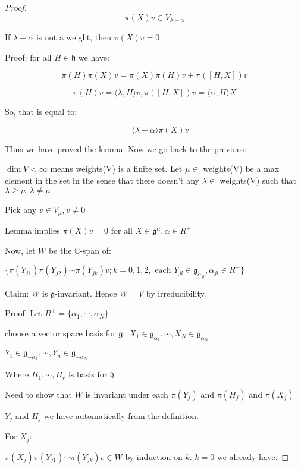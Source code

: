 \documentclass{article}
\theoremstyle{definition}
\begin{document}
\begin{proof}
    \[
        \pi (X)v \in V_{\lambda + \alpha}
    \]

    If \(\lambda + \alpha\) is not a weight, then \(\pi (X)v = 0\) 
    
    Proof: for all \(H\in \mathfrak{h}\) we have:

    \[
        \pi(H)\pi(X)v = \pi(X)\pi(H)v + \pi([H,X]) v
    \]

    \[
        \pi(H)v = \langle \lambda , H \rangle v, \pi ([H,X])v = \langle \alpha,H \rangle X
    \]

    So, that is equal to:

    \[
        = \langle \lambda + \alpha \rangle \pi(X)v
    \]

    Thus we have proved the lemma. Now we go back to the previous:
    
    \(\dim V < \infty\) means weights(V) is a finite set. Let \(\mu \in \) weights(V) be a max element in the set in the sense that there doesn't any \(\lambda \in\) weights(V) such that \(\lambda \geq \mu, \lambda \neq \mu\) 

    Pick any \(v\in V_\mu, v\neq 0\)
    
    Lemma implies \(\pi(X)v = 0\) for all \(X\in \mathfrak{g} ^\alpha , \alpha \in R^+\) 

    Now, let \(W\) be the \(\mathbb{C}\)-span of:

    \(\{ \pi(Y_{j1}) \pi(Y_{j2})\cdots \pi(Y_{jk}) v ; k = 0,1,2, \text{ each } Y_{jl} \in \mathfrak{g}_{\alpha_{jl}}, \alpha_{jl}\in R^- \} \) 

    Claim: \(W\) is \(\mathfrak{g}\)-invariant. Hence \(W = V\) by irreducibility.

    Proof: Let \(R^+ = \{ \alpha_1,\cdots, \alpha_N \} \) 

    choose a vector space basis for \(\mathfrak{g}:\) \(X_1 \in \mathfrak{g}_{\alpha_1}, \cdots, X_N\in \mathfrak{g}_{\alpha_N} \)
    
    \(Y_1\in \mathfrak{g}_{-\alpha_1},\cdots, Y_n\in \mathfrak{g}_{-\alpha_N} \)
    
    Where \(H_1,\cdots, H_r\) is basis for \(\mathfrak{h} \) 

    Need to show that \(W\) is invariant under each \(\pi (Y_j)\) and \(\pi(H_j)\) and \(\pi(X_j)\) 

    \(Y_j\) and \(H_j\) we have automatically from the definition.

    For \(X_j\):

    \(\pi(X_j)\pi (Y_{j1})\cdots \pi(Y_{jk})v \in W\) by induction on \(k\). \(k=0\) we already have.


\end{proof}
\end{document}
